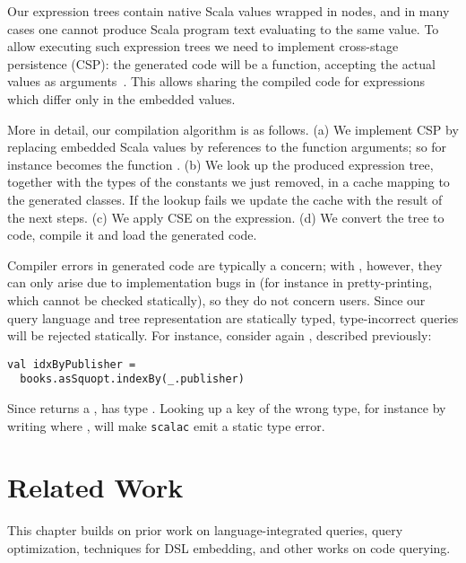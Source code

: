 Our expression trees contain native Scala values wrapped in  nodes,
and in many cases one cannot produce Scala program text evaluating to the same value.
To allow executing such expression trees we need to implement cross-stage
persistence (CSP): the generated code will be a function, accepting the actual
values as arguments~\citep{rompf2010lightweight}. This allows sharing the compiled
code for expressions which differ only in the embedded values.

More in detail, our compilation algorithm is as follows.
(a) We implement CSP by replacing embedded Scala values by references to the
function arguments; so for instance  becomes
the function .
(b) We look up the produced expression tree, together with the types of the
constants we just removed, in a cache mapping to the generated classes. If the
lookup fails we update the cache with the result of the next steps.
(c) We apply CSE on the expression.
(d) We convert the tree to code, compile it and load the generated code.

Compiler errors in generated code are typically a concern; with \LoS{}, however,
they can only arise due to implementation bugs in \LoS{} (for instance in
pretty-printing, which cannot be checked statically), so they do not concern
users.
Since our query language and tree representation are statically typed,
type-incorrect queries will be rejected statically.
For instance, consider again , described previously:
\begin{lstlisting}
val idxByPublisher =
  books.asSquopt.indexBy(_.publisher)
\end{lstlisting}
Since  returns a ,  has
type . Looking up a key of the wrong type, for
instance by writing  where , will
make \texttt{scalac} emit a static type error.



\section{Related Work}
\label{sec:relwork}
This chapter builds on prior work on language-integrated queries, query optimization, techniques for DSL embedding, and other works on code querying.

